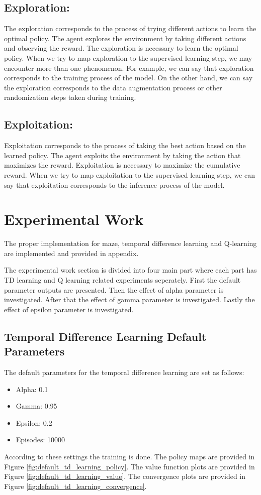 \documentclass{assignment}
\begin{document}
\subsection{Exploration: }
The exploration corresponds to the process of trying different actions to learn the optimal policy. The agent explores the environment by taking different actions and observing the reward. The exploration is necessary to learn the optimal policy. When we try to map exploration to the supervised learning step, we may encounter more than one phenomenon. For example, we can say that exploration corresponds to the training process of the model. On the other hand, we can say the exploration corresponds to the data augmentation process or other randomization steps taken during training.

\subsection{Exploitation: }
Exploitation corresponds to the process of taking the best action based on the learned policy. The agent exploits the environment by taking the action that maximizes the reward. Exploitation is necessary to maximize the cumulative reward. When we try to map exploitation to the supervised learning step, we can say that exploitation corresponds to the inference process of the model. 

\section{Experimental Work}
The proper implementation for maze, temporal difference learning and Q-learning are implemented and provided in appendix. 

\noindent The experimental work section is divided into four main part where each part has TD learning and Q learning related experiments seperately. First the default parameter outputs are presented. Then the effect of alpha parameter is investigated. After that the effect of gamma parameter is investigated. Lastly the effect of epsilon parameter is investigated.
\subsection{Temporal Difference Learning Default Parameters}
The default parameters for the temporal difference learning are set as follows:
\begin{itemize}
    \item Alpha: 0.1
    \item Gamma: 0.95
    \item Epsilon: 0.2
    \item Episodes: 10000
\end{itemize}
According to these settings the training is done. The policy maps are provided  in Figure \ref{fig:default_td_learning_policy}. The value function plots are provided in Figure \ref{fig:default_td_learning_value}. The convergence plots are provided in Figure \ref{fig:default_td_learning_convergence}.
\end{document}
